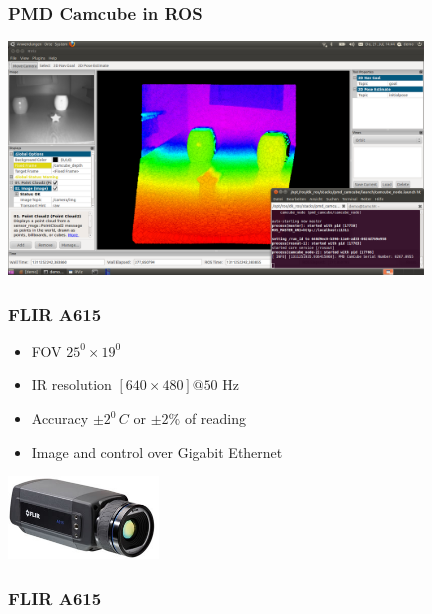 \begin{frame}
 \frametitle{PMD Camcube in ROS}
\includegraphics[width=11cm]{img/camcube_ros.png}
\end{frame}

\begin{frame}
 \frametitle{FLIR A615}
\begin{itemize}
  \item FOV $25^0 \times 19^0$
  \item IR resolution $[640 \times 480]@50$ Hz
  \item Accuracy $\pm 2^0\,C$ or $\pm 2\%$ of reading
  \item Image and control over Gigabit Ethernet
\end{itemize}

\vspace{5ex}\hspace{37ex}\includegraphics[width=4cm]{img/A615_300.jpg}
\end{frame}

\begin{frame}
 \frametitle{FLIR A615}
\end{frame}

